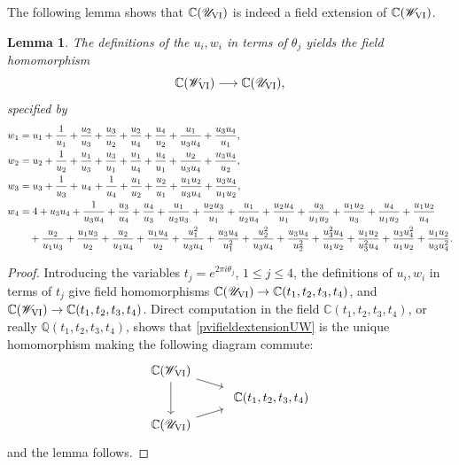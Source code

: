 \documentclass[a4paper,reqno]{amsart}
\numberwithin{equation}{section}
\newcommand{\C}{\mathbb{C}}
\newtheorem{lemma}[theorem]{Lemma}
\numberwithin{equation}{section}
\begin{document}

The following lemma shows that $\C(\mathscr{U}_{\rm{VI}})$ is indeed a field extension of $\C(\mathscr{W}_{\rm{VI}})$.
\begin{lemma}     \label{lem:PvimorphismUtoW}
The definitions of the $u_i,w_i$ in terms of $\theta_j$ yields the field homomorphism 
    \begin{equation} \label{pvifieldextensionUW}
    \C(\mathscr{W}_{\rm{VI}}) \longrightarrow \C(\mathscr{U}_{\rm{VI}}) ,
    \end{equation}
   specified by 
\begin{align*}
	w_1&=u_1+\frac{1}{u_1}+\frac{u_2}{u_3}+\frac{u_3}{u_2}+\frac{u_2}{u_4}+\frac{u_4}{u_2}+\frac{u_1}{u_3 u_4}+\frac{u_3 u_4}{u_1},\\
	w_2&=u_2+\frac{1}{u_2}+\frac{u_1}{u_3}+\frac{u_3}{u_1}+\frac{u_1}{u_4}+\frac{u_4}{u_1}+\frac{u_2}{u_3 u_4}+\frac{u_3 u_4}{u_2},\\
    w_3&=u_3+\frac{1}{u_3}+\hspace{0.5mm}u_4\hspace{0.5mm}+\frac{1}{u_4}+\frac{u_1}{u_2}+\frac{u_2}{u_1}+\frac{u_1 u_2}{u_3 u_4}+\frac{u_3 u_4}{u_1 u_2},\\
	w_4&=4
    +u_3 u_4
    +\frac{1}{u_3 u_4}
    +\frac{u_3}{u_4}
    +\frac{u_4}{u_3}  
    +\frac{u_1}{u_2 u_3}
    +\frac{u_2 u_3}{u_1}
    +\frac{u_1}{u_2 u_4}
    +\frac{u_2 u_4}{u_1}
    +\frac{u_3}{u_1 u_2}
    +\frac{u_1 u_2}{u_3}
    +\frac{u_4}{u_1 u_2}
    +\frac{u_1 u_2}{u_4}\\
    &\quad  +\frac{u_2}{u_1 u_3}
    +\frac{u_1 u_3}{u_2}
    +\frac{u_2}{u_1 u_4}
    +\frac{u_1 u_4}{u_2}
    +\frac{u_1^2}{u_3 u_4}
    +\frac{u_3 u_4}{u_1^2}
    +\frac{u_2^2}{u_3 u_4}
    +\frac{u_3 u_4}{u_2^2}
    +\frac{u_3^2 u_4}{u_1 u_2}
    +\frac{u_1 u_2}{u_3^2 u_4}
    +\frac{u_3 u_4^2}{u_1 u_2}
    +\frac{u_1 u_2}{u_3 u_4^2}.
\end{align*}
 \end{lemma}
 \begin{proof}
 Introducing the variables $t_j=e^{2\pi i \theta_j}$, $1\leq j\leq 4$, the definitions of $u_i,w_i$ in terms of $t_j$ give field homomorphisms $\C(\mathscr{U}_{\rm{VI}}) \to  \mathbb{C}(t_1,t_2,t_3,t_4)$, and $\C(\mathscr{W}_{\rm{VI}}) \to  \mathbb{C}(t_1,t_2,t_3,t_4)$. Direct computation in the field $\mathbb{C}(t_1,t_2,t_3,t_4)$, or really $\mathbb{Q}(t_1,t_2,t_3,t_4)$, shows that \eqref{pvifieldextensionUW} is the unique homomorphism making the following diagram commute:
 \begin{equation*}
     \begin{tikzcd}[sep=tiny]
        \C(\mathscr{W}_{\rm{VI}}) \arrow[dd] \arrow[dr]& \\
        & \qquad \mathbb{C}(t_1,t_2,t_3,t_4) \\
         \C(\mathscr{U}_{\rm{VI}}) \arrow[ur]
     \end{tikzcd}
 \end{equation*}
 and the lemma follows.
 \end{proof}
\end{document}
